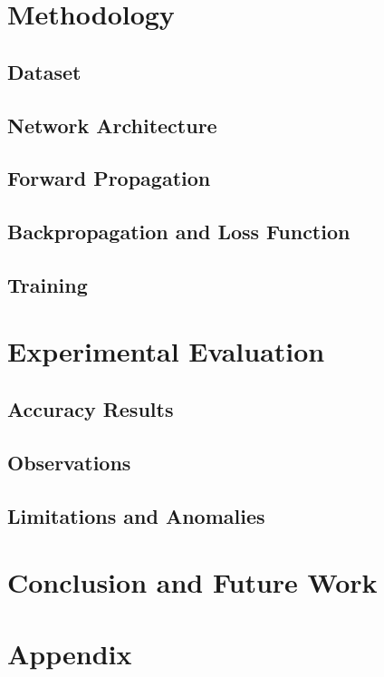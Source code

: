 \documentclass[11pt]{article}
\begin{document}
\section{Methodology}
\subsection{Dataset}

\subsection{Network Architecture}

\subsection{Forward Propagation}

\subsection{Backpropagation and Loss Function}

\subsection{Training}

\section{Experimental Evaluation}
\subsection{Accuracy Results}

\subsection{Observations}

\subsection{Limitations and Anomalies}

\section{Conclusion and Future Work}

\appendix
\section*{Appendix}

\begin{thebibliography}{9}
\end{thebibliography}
\end{document}
